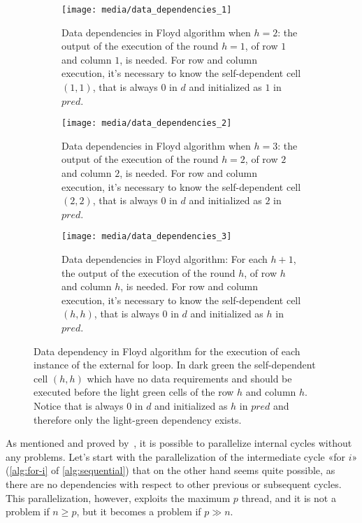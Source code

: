 \begin{figure}[htbp]
    \centering
    \begin{subfigure}[t]{0.3\textwidth}
        \centering
        \texttt{[image: media/data\_dependencies\_1]}
        \caption{Data dependencies in Floyd algorithm when \(h=2\): the output of the execution of the round \(h=1\), of row \(1\) and column \(1\), is needed. For row and column execution, it's necessary to know the self-dependent cell \((1,1)\), that is always \(0\) in \(d\) and initialized as \(1\) in \(pred\).}
        \label{fig:data-dependencies-1}
    \end{subfigure}
    \hfill
    \begin{subfigure}[t]{0.3\textwidth}
        \centering
        \texttt{[image: media/data\_dependencies\_2]}
        \caption{Data dependencies in Floyd algorithm when \(h=3\): the output of the execution of the round \(h=2\), of row \(2\) and column \(2\), is needed. For row and column execution, it's necessary to know the self-dependent cell \((2,2)\), that is always \(0\) in \(d\) and initialized as \(2\) in \(pred\).}
        \label{fig:data-dependencies-2}
    \end{subfigure}
    \hfill
    \begin{subfigure}[t]{0.3\textwidth}
        \centering
        \texttt{[image: media/data\_dependencies\_3]}
        \caption{Data dependencies in Floyd algorithm: For each \(h+1\), the output of the execution of the round \(h\), of row \(h\) and column \(h\), is needed. For row and column execution, it's necessary to know the self-dependent cell \((h,h)\), that is always \(0\) in \(d\) and initialized as \(h\) in \(pred\).}
        \label{fig:data-dependencies-3}
    \end{subfigure}
    \caption{Data dependency in Floyd algorithm for the execution of each instance of the external for loop. In dark green the self-dependent cell \((h,h)\) which have no data requirements and should be executed before the light green cells of the row \(h\) and column \(h\). Notice that is always \(0\) in \(d\) and initialized as \(h\) in \(pred\) and therefore only the light-green dependency exists.}
    \label{fig:data-dependency-external-loop}
\end{figure}

As mentioned and proved by~\cite{rucci}, it is possible to parallelize internal cycles without any problems. 
Let's start with the parallelization of  the intermediate cycle «for \(i\)» (\cref{alg:for-i} of \cref{alg:sequential}) that on the other hand seems quite possible, as there are no dependencies with respect to other previous or subsequent cycles.
This parallelization, however, exploits the maximum \(p\) thread, and it is not a problem if \(n \geq p\), but it becomes a problem if \(p \gg n\).

